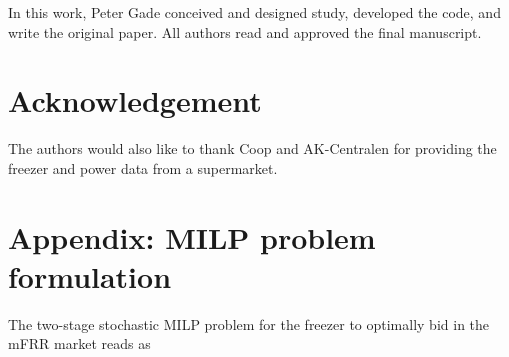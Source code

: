 \documentclass[11pt,a4paper]{article}
\begin{document}
In this work, Peter Gade conceived and designed study, developed the code, and write the original paper. All authors read and approved the final manuscript.

\section*{Acknowledgement}

The authors would also like to thank Coop and AK-Centralen for providing the freezer and power data from a supermarket.

\section*{Appendix: MILP problem formulation}\label{appendix:A}

\begingroup
\allowdisplaybreaks
The two-stage stochastic MILP problem for the freezer to optimally bid in the mFRR market reads as
%
\end{document}
